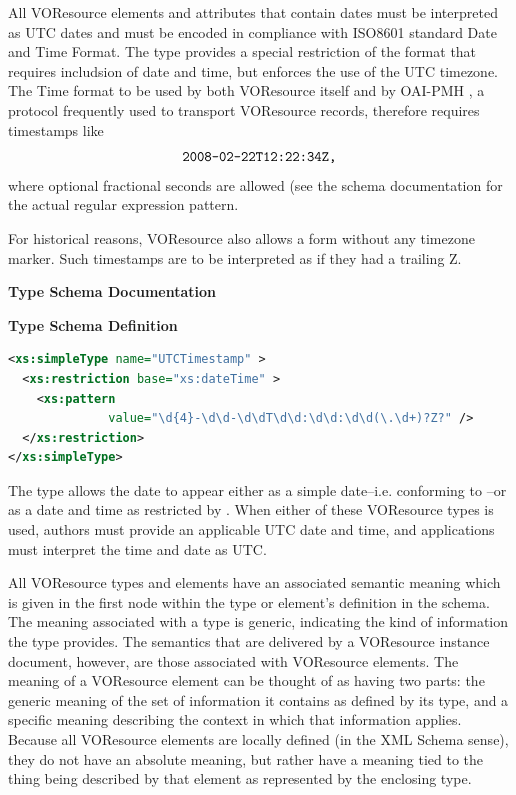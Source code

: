 \documentclass[11pt,a4paper]{ivoa}
\begin{document}
All VOResource elements and attributes that contain dates must be
interpreted as UTC dates and must be encoded in compliance with ISO8601
\citep{std:iso8601}
standard Date and Time Format.  The  type
provides a special restriction of the format that requires includsion of
date and time, but enforces the use of the UTC timezone.  The Time
format to be used by both VOResource itself and by OAI-PMH
\citep{std:oaipmh}, a protocol frequently used to transport VOResource
records, therefore requires timestamps like
$$\hbox{\texttt{2008-02-22T12:22:34Z,}}$$
where optional fractional seconds are allowed (see the schema
documentation for the actual regular expression pattern.

For historical reasons, VOResource also allows a form without any
timezone marker.  Such timestamps are to be interpreted as  if they had
a trailing Z.

\begingroup
      	\renewcommand*\descriptionlabel[1]{%
      	\hbox to 5.5em{\emph{#1}\hfil}}\vspace{2ex}\noindent\textbf{ Type Schema Documentation}


\vspace{1ex}\noindent\textbf{ Type Schema Definition}

\begin{lstlisting}[language=XML,basicstyle=\footnotesize]
<xs:simpleType name="UTCTimestamp" >
  <xs:restriction base="xs:dateTime" >
    <xs:pattern
              value="\d{4}-\d\d-\d\dT\d\d:\d\d:\d\d(\.\d+)?Z?" />
  </xs:restriction>
</xs:simpleType>
\end{lstlisting}\endgroup


The  type allows the date to appear either
as a simple date--i.e. conforming to --or as a
date and time as restricted by .  
When either of these VOResource types is used, authors must provide an
applicable UTC date and time, and applications must interpret the time
and date as UTC. 

All VOResource types and elements have an associated semantic meaning
which is given in the first 
node within the type or element's definition in the schema.  The
meaning associated with a type is generic, indicating the kind of
information the type provides.  The semantics that are delivered by a
VOResource instance document, however, are those associated with
VOResource elements.  The meaning of a VOResource element can be
thought of as having two parts:  the generic meaning of the set of
information it contains as defined by its type, and a specific meaning
describing the context in which that information applies.  Because all
VOResource elements are locally defined (in the XML Schema
sense), they do not have an absolute meaning, but rather have a
meaning tied to the thing being described by that element as
represented by the enclosing type.  
\end{document}
